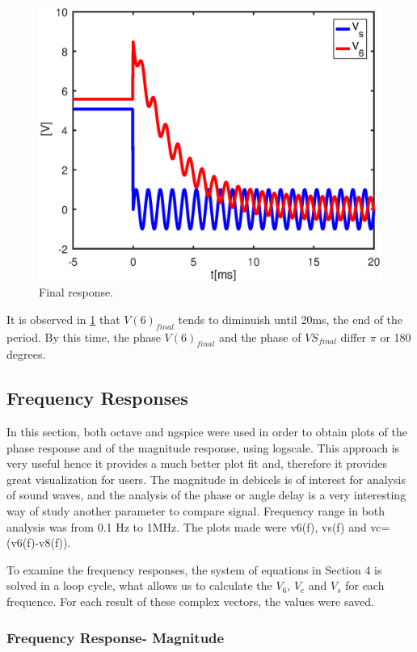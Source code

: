 \begin{figure}[h] \centering
\includegraphics[width=0.6\linewidth]{part4.eps}
\caption{Final response.}
\label{fig:part4}
\end{figure}

\par It is observed in \ref{fig:part4} that $V(6)_{final}$ tends to diminuish  until 20ms, the end of the period. By this time, the phase $V(6)_{final}$ and the phase of  $VS_{final}$ differ $\pi$ or 180 degrees.




\subsection{Frequency Responses}

In this section, both octave and ngspice were used in order to obtain plots of the phase response and of the magnitude response, using logscale. This approach is very useful hence it provides a much better plot fit and, therefore it provides great visualization for users. The magnitude in debicels is of interest for analysis of sound waves, and the analysis of the phase or angle delay is a very interesting way of study another parameter to compare signal. Frequency range in both analysis was from 0.1 Hz to 1MHz. The plots made were v6(f), vs(f) and vc=(v6(f)-v8(f)).



To examine the frequency responses, the system of equations in Section 4 is solved in a loop cycle, what allows us to calculate the $V_6$, $V_c$ and $V_s$ for each frequence. For each result of these complex vectors, the values were saved.

\subsubsection{Frequency Response- Magnitude}

